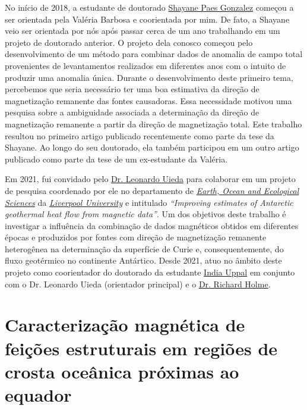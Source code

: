 No início de 2018, a estudante de doutorado 
\href{https://lattes.cnpq.br/5954916221599872}{Shayane Paes Gonzalez}
começou a ser orientada pela Valéria Barbosa e coorientada por mim. 
De fato, a Shayane veio ser orientada por nós após passar cerca de um ano trabalhando 
em um projeto de doutorado anterior. 
O projeto dela conosco começou pelo desenvolvimento de um método para combinar dados
de anomalia de campo total provenientes de levantamentos realizados em diferentes anos
com o intuito de produzir uma anomalia única. Durante o desenvolvimento deste primeiro tema,
percebemos que seria necessário ter uma boa estimativa da direção de magnetização remanente
das fontes causadoras. Essa necessidade motivou uma pesquisa sobre a ambiguidade associada 
a determinação da direção de magnetização remanente a partir da direção de magnetização
total. Este trabalho resultou no primeiro artigo publicado recentemente como parte da tese
da Shayane.
Ao longo do seu doutorado, ela também participou em um outro artigo publicado como parte
da tese de um ex-estudante da Valéria. 

Em 2021, fui convidado pelo 
\href{https://www.liverpool.ac.uk/environmental-sciences/staff/leonardo-uieda/}{Dr. Leonardo Uieda} 
para colaborar em um projeto de pesquisa coordenado por ele no departamento de
\href{https://www.liverpool.ac.uk/earth-ocean-and-ecological-sciences/}{\textit{Earth, Ocean and Ecological Sciences}} da 
\href{https://www.liverpool.ac.uk/}{\textit{Liverpool University}} e 
intitulado 
\textit{``Improving estimates of Antarctic geothermal heat flow from magnetic data''}. 
Um dos objetivos deste trabalho é investigar a influência da combinação de dados
magnéticos obtidos em diferentes épocas e produzidos por fontes com direção de magnetização
remanente heterogênea na determinação da superfície de Curie e, consequentemente, do
fluxo geotérmico no continente Antártico.
Desde 2021, atuo no âmbito deste projeto como 
coorientador do doutorado da estudante  
\href{https://orcid.org/0000-0003-3531-2656}{India Uppal} em conjunto com o Dr. Leonardo
Uieda (orientador principal) e o 
\href{https://www.liverpool.ac.uk/environmental-sciences/staff/richard-holme/}{Dr. Richard Holme}.

\section{Caracterização magnética de feições estruturais em regiões de crosta oceânica próximas ao equador} 
\label{sec:projeto-baixas-latitudes}

